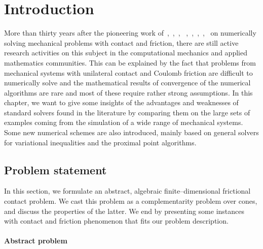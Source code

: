 \newcommand{\tb}[1]{\textcolor{blue}{#1}}
\newcommand{\tg}[1]{#1}
\newcommand{\tgg}[1]{\textcolor{applegreen}{#1}}
\newcommand{\moh}[1]{\textcolor{applegreen}{#1}}
\newcommand{\MM}[0]{\rightrightarrows}










\section{Introduction}



More than thirty years after the pioneering work of~\cite{Panagiotopoulos_IA1975},~\cite{Necas.ea1980},~\cite{Haslinger1983,Haslinger1984,Haslinger.Panagiotopoulos_PRSE1984}, ~\cite{z-DelPieroMaceri_CISM1983,z-DelPieroMaceri_CISM1985},~\cite{Katona_IJNAMG1983},~\cite{Chaudhary.Bathe_CS1986},~\cite{Jean.Moreau1987},~\cite{Mitsopoulou.Doudoumis1988} on numerically solving mechanical problems with contact and friction, there are still active research activities on this subject in the computational mechanics and applied mathematics communities.  This can be explained by the fact that {problems from} mechanical systems with unilateral contact and Coulomb friction are difficult to numerically solve and the mathematical results of convergence of the numerical algorithms are rare and most of these require rather strong assumptions. In this chapter, we want to give some insights of the advantages and weaknesses of standard solvers found in the literature by comparing them on the large sets of examples coming from the simulation of a wide range of mechanical systems. Some new numerical schemes are also introduced, mainly based on general solvers for variational inequalities and the proximal point algorithms.

\subsection{Problem statement}
In this section, we formulate an abstract, algebraic finite--dimensional frictional contact problem. We cast this problem as a complementarity problem over cones, and discuss the properties of the latter.
We end by presenting some instances with contact and friction phenomenon that fits our problem description.

\paragraph{Abstract problem}

